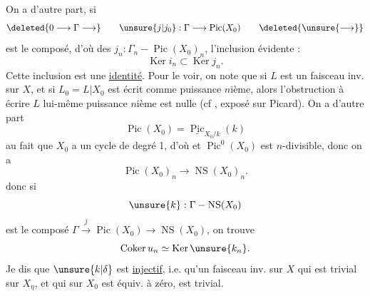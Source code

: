 
On a d'autre part, si
\[
\deleted{0\longrightarrow\Gamma\longrightarrow}\qquad \unsure{j|j_0}:\Gamma\longrightarrow\operatorname{Pic}(X_0)\qquad\deleted{\unsure{\longrightarrow}}
\]
est le composé, d'où des $j_n:\Gamma_n\mathbin{-}\operatorname{Pic}(X_0)_n$,  l'inclusion évidente :
\[
\operatorname{Ker}i_n\subset\operatorname{Ker}j_n.
\]
Cette inclusion est  une \uline{identité}. Pour le voir, on note que si $L$ est un faisceau inv. sur $X$, et si $L_0=L|X_0$ est écrit comme puissance $n$ième, alors l'obstruction à écrire $L$ lui-même puissance $n$ième est nulle (cf , exposé sur Picard). On a d'autre part
\[
\operatorname{Pic}(X_0)=\underline{\operatorname{Pic}}_{X_0/k}(k)
\]
 au fait que $X_0$ a un cycle de degré 1, d'où
et $\operatorname{Pic}^{0}(X_0)$ est $n$-divisible, donc on a
\[
\operatorname{Pic}(X_0)_n\longrightarrow\operatorname{NS}(X_0)_n.
\]
donc si
\[
\unsure{k}:\Gamma\mathbin{-}\operatorname{NS}(X_0)
\]
est le composé $\Gamma\xrightarrow{j}\operatorname{Pic}(X_0)\longrightarrow\operatorname{NS}(X_0)$, on trouve
\[
\operatorname{Coker}u_n\simeq\operatorname{Ker}\unsure{k_n}.
\]
Je dis que  $\unsure{k|\delta}$ est \uline{injectif}, i.e. qu'un faisceau inv. sur $X$ qui est trivial sur $X_\eta$, et qui sur $X_0$ est  équiv. à zéro, est trivial.

